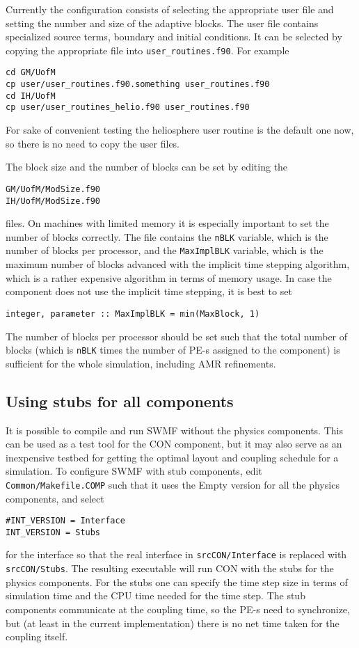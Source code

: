 Currently the configuration consists of selecting the 
appropriate user file and setting the number and size of the
adaptive blocks. The user file contains specialized
source terms, boundary and initial conditions. It can be 
selected by copying the appropriate file into {\tt user\_routines.f90}.
For example
\begin{verbatim}
cd GM/UofM
cp user/user_routines.f90.something user_routines.f90
cd IH/UofM
cp user/user_routines_helio.f90 user_routines.f90
\end{verbatim}
For sake of convenient testing the heliosphere user routine is
the default one now, so there is no need to copy the user files.

The block size and the number of blocks can be set by editing the
\begin{verbatim}
GM/UofM/ModSize.f90
IH/UofM/ModSize.f90
\end{verbatim}
files. On machines with limited memory it is especially important to
set the number of blocks correctly. The file contains the {\tt nBLK}
variable, which is the number of blocks per processor, and the
{\tt MaxImplBLK} variable, which is the maximum number of blocks
advanced with the implicit time stepping algorithm, which is a
rather expensive algorithm in terms of memory usage. In case the
component does not use the implicit time stepping, it is best to set
\begin{verbatim}
integer, parameter :: MaxImplBLK = min(MaxBlock, 1)
\end{verbatim}
The number of blocks per processor should be set such that the total
number of blocks (which is {\tt nBLK} times the number of PE-s
assigned to the component) is sufficient for the whole simulation,
including AMR refinements. 

\subsection{Using stubs for all components}

It is possible to compile and run SWMF without the physics components.
This can be used as a test tool for the CON component, but it may
also serve as an inexpensive testbed for getting the optimal layout
and coupling schedule for a simulation. To configure SWMF with 
stub components, edit {\tt Common/Makefile.COMP} such that it
uses the Empty version for all the physics components, and select
\begin{verbatim}
#INT_VERSION = Interface
INT_VERSION = Stubs
\end{verbatim}
for the interface so that the real interface in {\tt srcCON/Interface}
is replaced with {\tt srcCON/Stubs}.
The resulting executable will run CON with 
the stubs for the physics components. For the stubs one can
specify the time step size in terms of simulation time and the
CPU time needed for the time step. The stub components communicate
at the coupling time, so the PE-s need to synchronize, but 
(at least in the current implementation) there is no net time taken
for the coupling itself. 

